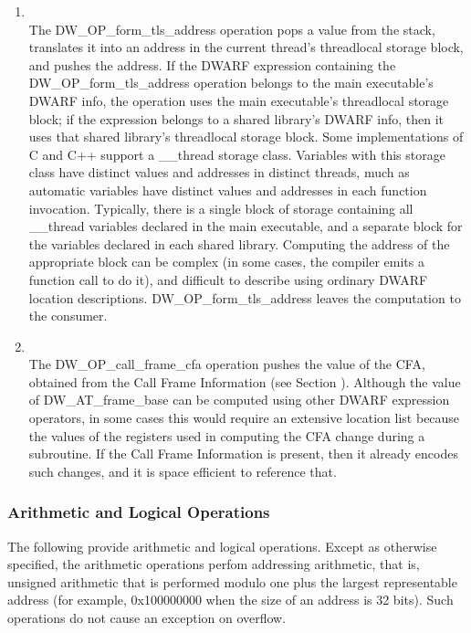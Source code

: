 \begin{enumerate}[1]
\item {} \\
The DW\_OP\_form\_tls\_address operation pops a value from the
stack, translates it into an address in the current thread's
thread\dash local storage block, and pushes the address. If the
DWARF expression containing the DW\_OP\_form\_tls\_address
operation belongs to the main executable's DWARF info, the
operation uses the main executable's thread\dash local storage
block; if the expression belongs to a shared library's
DWARF info, then it uses that shared library's thread\dash local
storage block.  Some implementations of C and C++ support a
\_\_thread storage class. Variables with this storage class
have distinct values and addresses in distinct threads, much
as automatic variables have distinct values and addresses in
each function invocation. Typically, there is a single block
of storage containing all \_\_thread variables declared in
the main executable, and a separate block for the variables
declared in each shared library. Computing the address of
the appropriate block can be complex (in some cases, the
compiler emits a function call to do it), and difficult
to describe using ordinary DWARF location descriptions.
DW\_OP\_form\_tls\_address leaves the computation to the
consumer.

\item {} \\
The DW\_OP\_call\_frame\_cfa operation pushes the value of the
CFA, obtained from the Call Frame Information 
(see Section ).
Although the value of DW\_AT\_frame\_base
can be computed using other DWARF expression operators,
in some cases this would require an extensive location list
because the values of the registers used in computing the
CFA change during a subroutine. If the 
Call Frame Information 
is present, then it already encodes such changes, and it is
space efficient to reference that.
\end{enumerate}

\subsubsection{Arithmetic and Logical Operations}
The following provide arithmetic and logical operations. Except
as otherwise specified, the arithmetic operations perfom
addressing arithmetic, that is, unsigned arithmetic that is
performed modulo one plus the largest representable address
(for example, 0x100000000 when the size of an address is 32
bits). Such operations do not cause an exception on overflow.

